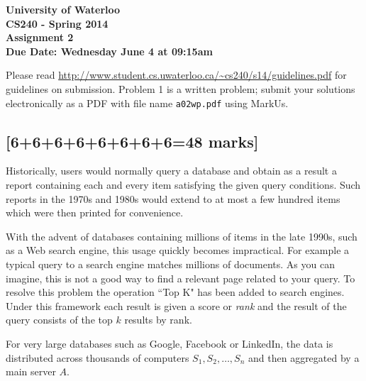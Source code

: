 \documentclass[12pt]{article}
\begin{document}
\begin{center}
{\Large\bf University of Waterloo}\\
\vspace{3mm}
{\Large\bf CS240 - Spring 2014}\\
\vspace{2mm}
{\Large\bf Assignment 2}\\
\vspace{3mm}
\textbf{Due Date: Wednesday June 4 at 09:15am}
\end{center}

\def\question#1{\item[\bf #1.]}
\def\part#1{\item[\bf #1)]}
\newcommand{\pc}[1]{\mbox{\textbf{#1}}} %

Please read
\url{http://www.student.cs.uwaterloo.ca/~cs240/s14/guidelines.pdf}
for guidelines on submission.
Problem 1 is a written
problem; submit your solutions electronically as a PDF with file name {\tt a02wp.pdf} using MarkUs. 

\subsection{[6+6+6+6+6+6+6+6=48 marks]}
Historically, users would normally query a database and obtain as a result a report
containing each and every item satisfying the given query conditions. Such reports
in the 1970s and 1980s would extend to at most a few hundred items which were
then printed for convenience.

With the advent of databases containing millions
of items in the late 1990s, such as a Web search engine, this usage quickly becomes impractical.
For example a typical query to a search engine matches millions of documents.
As you can imagine, this is not a good way to find a relevant page related to
your query. To resolve this problem the operation ``Top K" has been added
to search engines. Under this framework each result is given a score or {\it rank}
and the result of the query consists of the top $k$ results by rank.

For very large databases such as Google, Facebook or LinkedIn, the data
is distributed across thousands of computers $S_1, S_2,\ldots, S_n$ and then aggregated by a main
server $A$.
\end{document}
